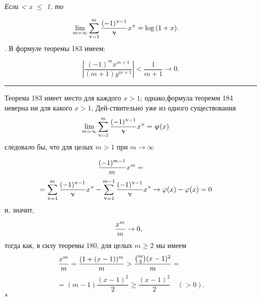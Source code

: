\documentclass[a5paper]{book}
\begin{document}
   \vspace{-1mm}{\bfseries \:Теорема 184. } \itshape Если   < \itshape x \upshape $\leqslant$ 1, \itshape то \upshape \par
   $$ \hspace{-5mm} \lim_{m = \infty} \sum_{\upnu = 1}^{m}  {\frac{(-1)^{\upnu - 1}}{\upnu}}x^{\upnu} = \log{}{(1+x)}.$$
    \:\:\;\quad{}. В формуле теоремы 183 имеем:\par
   $$ \left| {\frac{(-1)^{m}x^{m+1}}{(m+1)y^{m+1}}} \right| < \frac{1}{m + 1} \to 0.$$
    \quad \quad \quad \quad\quad \quad\quad\quad\quad\quad\quad\quad\quad\quad\quad\quad\quad\quad\quad\quad
   \begin{center}
   \rule{90pt}{1pt}
   \end{center}
   \quad \quad \quad \quad\quad \quad\quad\quad\quad\quad\quad\quad\quad\quad\quad\quad\quad\quad\quad\quad
    Теорема 183 имеет место для каждого $x > 1$; однако,\linebreak формула теоремм 184 неверна ни для какого $x > 1$, Дей-\linebreak ствительно уже из одного существования
   $$ \hspace{-5mm} \lim_{m = \infty} \sum\limits_{\upnu = 1}^{m} {\frac{(-1)^{\upnu-1}}{\upnu}}x^{\upnu} = \upvarphi(x)$$
   следовало бы, что для целых $m > 1$ при $m \to \infty$ \par
   $$\hspace{-10mm} {\frac{(-1)^{m-1}}{m}}x^{m} =  $$
   $$ \hspace{-5mm} = \sum\limits_{\upnu = 1}^{m}{\frac{(-1)^{\upnu - 1}}{\upnu}}x^{\upnu} - \sum\limits_{\upnu = 1}^{m - 1}{\frac{(-1)^{\upnu - 1}}{\upnu}}x^{\upnu} \to \varphi(x) - \varphi(x) = 0 $$
   и, значит,\par
   $$\hspace{-2mm} \frac{x^m}{m} \to 0, $$
   тогда как, в силу теоремы 180, для целых $m \geqslant 2$ мы имеем\linebreak
  $$ \hspace{-12mm} {\frac{x^m}{m}} = {\frac{(1 + (x - 1))^m}{m}} > {\frac{{m \choose 2} (x - 1)^2}{m}} =  $$
  $$ = (m - 1) {\frac{(x - 1)^2}{2}} \geqslant {\frac{(x - 1)^2}{2}}  \quad(>0). $$
  \;\;*
  
   
\end{document}
